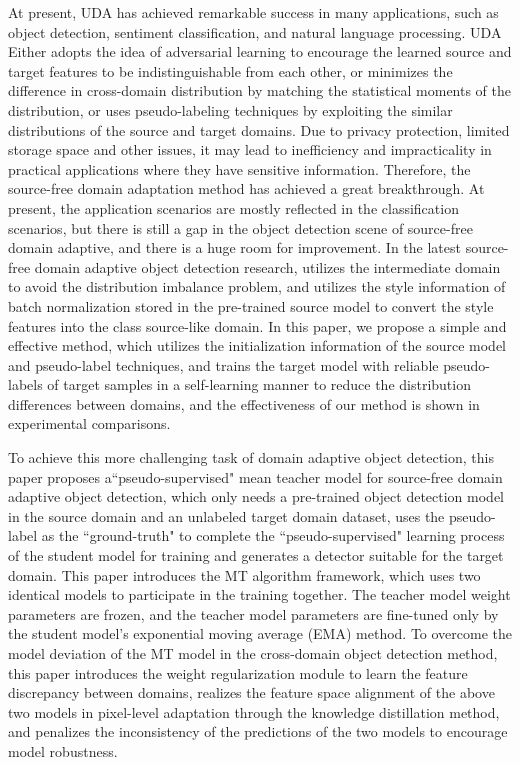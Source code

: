 \documentclass[sn-mathphys]{sn-jnl}%
\theoremstyle{thmstyleone}%
\theoremstyle{thmstyletwo}%
\theoremstyle{thmstylethree}%
\begin{document}
At present, UDA has achieved remarkable success in many applications, such as object detection\cite{zheng2020cross,xie2019multi}, sentiment classification\cite{sadr2022acnn,thakkar2022improving}, and natural language processing\cite{gururangan2020don}. UDA Either adopts the idea of adversarial learning\cite{kurmi2021domain,dong2020cscl} to encourage the learned source and target features to be indistinguishable from each other, or minimizes the difference in cross-domain distribution by matching the statistical moments of the distribution\cite{deng2021unbiased,zheng2020cross}, or uses pseudo-labeling techniques\cite{wang2020unsupervised} by exploiting the similar distributions of the source and target domains. Due to privacy protection, limited storage space and other issues\cite{wang2019eavesdrop,wang2020towards}, it may lead to inefficiency and impracticality in practical applications where they have sensitive information. Therefore, the source-free domain adaptation method has achieved a great breakthrough. At present, the application scenarios are mostly reflected in the classification scenarios\cite{liang2020we,kurmi2021domain,yang2020unsupervised}, but there is still a gap in the object detection scene of source-free domain adaptive, and there is a huge room for improvement. In the latest source-free domain adaptive object detection research, \cite{xiong2021source} utilizes the intermediate domain to avoid the distribution imbalance problem, and \cite{zhang2021source} utilizes the style information of batch normalization stored in the pre-trained source model to convert the style features into the class source-like domain. In this paper, we propose a simple and effective method, which utilizes the initialization information of the source model and pseudo-label techniques, and trains the target model with reliable pseudo-labels of target samples in a self-learning manner to reduce the distribution differences between domains, and the effectiveness of our method is shown in experimental comparisons.

To achieve this more challenging task of domain adaptive object detection, this paper proposes a``pseudo-supervised" mean teacher model for source-free domain adaptive object detection, which only needs a pre-trained object detection model in the source domain and an unlabeled target domain dataset, uses the pseudo-label as the ``ground-truth" to complete the ``pseudo-supervised" learning process of the student model for training and generates a detector suitable for the target domain. This paper introduces the MT algorithm framework\cite{deng2021unbiased,liu2021unbiased,he2018adaptive}, which uses two identical models to participate in the training together. The teacher model weight parameters are frozen, and the teacher model parameters are fine-tuned only by the student model's exponential moving average (EMA) method. To overcome the model deviation of the MT model in the cross-domain object detection method, this paper introduces the weight regularization module to learn the feature discrepancy between domains, realizes the feature space alignment of the above two models in pixel-level adaptation through the knowledge distillation method, and penalizes the inconsistency of the predictions of the two models to encourage model robustness.
\end{document}
